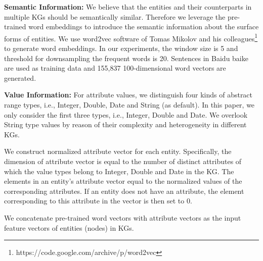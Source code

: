 	\noindent \textbf{Semantic Information:}
	\label{wordvector} 
	We believe that the entities and their counterparts in multiple KGs should be semantically similar. Therefore we leverage the pre-trained word embeddings to introduce the semantic information about the surface forms of entities.
	We use word2vec software of Tomas Mikolov and his colleagues\footnote{https://code.google.com/archive/p/word2vec} to generate word embeddings. In our experiments, the window size is 5 and threshold for downsampling the frequent words is 20. Sentences in Baidu baike are used as training data and 155,837 100-dimensional word vectors are generated.
	
	\noindent \textbf{Value Information:} 
	For attribute values, we distinguish four kinds of abstract range types, i.e., Integer, Double, Date and String (as default). In this paper, we only consider the first three types, i.e., Integer, Double and Date. We overlook String type values by reason of their complexity and heterogeneity in different KGs.
	
	We construct normalized attribute vector for each entity. Specifically, the dimension of attribute vector is equal to the number of distinct attributes of which the value types belong to Integer, Double and Date in the KG. The elements in an entity’s attribute vector equal to the normalized values of the corresponding attributes. If an entity does not have an attribute, the element corresponding to this attribute in the vector is then set to 0.
	
	We concatenate pre-trained word vectors with attribute vectors as the input feature vectors of entities (nodes) in KGs.
	
